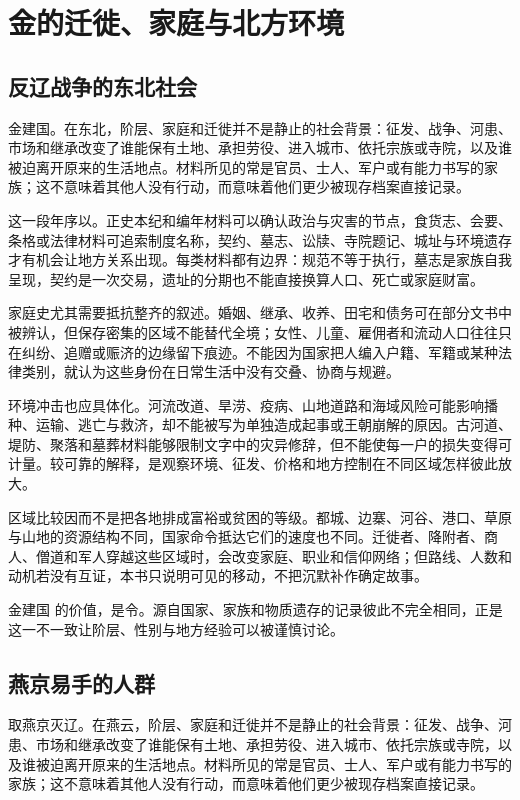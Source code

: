 \section{金的迁徙、家庭与北方环境}

\subsection{反辽战争的东北社会}

金建国。在东北，阶层、家庭和迁徙并不是静止的社会背景：征发、战争、河患、市场和继承改变了谁能保有土地、承担劳役、进入城市、依托宗族或寺院，以及谁被迫离开原来的生活地点。材料所见的常是官员、士人、军户或有能力书写的家族；这不意味着其他人没有行动，而意味着他们更少被现存档案直接记录。

这一段年序以。正史本纪和编年材料可以确认政治与灾害的节点，食货志、会要、条格或法律材料可追索制度名称，契约、墓志、讼牍、寺院题记、城址与环境遗存才有机会让地方关系出现。每类材料都有边界：规范不等于执行，墓志是家族自我呈现，契约是一次交易，遗址的分期也不能直接换算人口、死亡或家庭财富。

家庭史尤其需要抵抗整齐的叙述。婚姻、继承、收养、田宅和债务可在部分文书中被辨认，但保存密集的区域不能替代全境；女性、儿童、雇佣者和流动人口往往只在纠纷、追赠或赈济的边缘留下痕迹。不能因为国家把人编入户籍、军籍或某种法律类别，就认为这些身份在日常生活中没有交叠、协商与规避。

环境冲击也应具体化。河流改道、旱涝、疫病、山地道路和海域风险可能影响播种、运输、逃亡与救济，却不能被写为单独造成起事或王朝崩解的原因。古河道、堤防、聚落和墓葬材料能够限制文字中的灾异修辞，但不能使每一户的损失变得可计量。较可靠的解释，是观察环境、征发、价格和地方控制在不同区域怎样彼此放大。

区域比较因而不是把各地排成富裕或贫困的等级。都城、边寨、河谷、港口、草原与山地的资源结构不同，国家命令抵达它们的速度也不同。迁徙者、降附者、商人、僧道和军人穿越这些区域时，会改变家庭、职业和信仰网络；但路线、人数和动机若没有互证，本书只说明可见的移动，不把沉默补作确定故事。

金建国 的价值，是令。源自国家、家族和物质遗存的记录彼此不完全相同，正是这一不一致让阶层、性别与地方经验可以被谨慎讨论。

\subsection{燕京易手的人群}

取燕京灭辽。在燕云，阶层、家庭和迁徙并不是静止的社会背景：征发、战争、河患、市场和继承改变了谁能保有土地、承担劳役、进入城市、依托宗族或寺院，以及谁被迫离开原来的生活地点。材料所见的常是官员、士人、军户或有能力书写的家族；这不意味着其他人没有行动，而意味着他们更少被现存档案直接记录。

